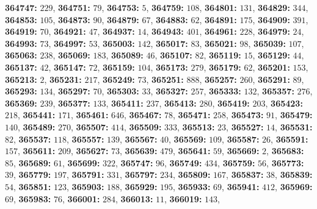 \textsf{\bfseries 364747:} $229$, \textsf{\bfseries 364751:} $79$, \textsf{\bfseries 364753:} $5$, \textsf{\bfseries 364759:} $108$, \textsf{\bfseries 364801:} $131$, \textsf{\bfseries 364829:} $344$, \textsf{\bfseries 364853:} $105$, \textsf{\bfseries 364873:} $90$, \textsf{\bfseries 364879:} $67$, \textsf{\bfseries 364883:} $62$, \textsf{\bfseries 364891:} $175$, \textsf{\bfseries 364909:} $391$, \textsf{\bfseries 364919:} $70$, \textsf{\bfseries 364921:} $47$, \textsf{\bfseries 364937:} $14$, \textsf{\bfseries 364943:} $401$, \textsf{\bfseries 364961:} $228$, \textsf{\bfseries 364979:} $24$, \textsf{\bfseries 364993:} $73$, \textsf{\bfseries 364997:} $53$, \textsf{\bfseries 365003:} $142$, \textsf{\bfseries 365017:} $83$, \textsf{\bfseries 365021:} $98$, \textsf{\bfseries 365039:} $107$, \textsf{\bfseries 365063:} $238$, \textsf{\bfseries 365069:} $183$, \textsf{\bfseries 365089:} $46$, \textsf{\bfseries 365107:} $82$, \textsf{\bfseries 365119:} $15$, \textsf{\bfseries 365129:} $44$, \textsf{\bfseries 365137:} $42$, \textsf{\bfseries 365147:} $72$, \textsf{\bfseries 365159:} $104$, \textsf{\bfseries 365173:} $279$, \textsf{\bfseries 365179:} $62$, \textsf{\bfseries 365201:} $153$, \textsf{\bfseries 365213:} $2$, \textsf{\bfseries 365231:} $217$, \textsf{\bfseries 365249:} $73$, \textsf{\bfseries 365251:} $888$, \textsf{\bfseries 365257:} $260$, \textsf{\bfseries 365291:} $89$, \textsf{\bfseries 365293:} $134$, \textsf{\bfseries 365297:} $70$, \textsf{\bfseries 365303:} $33$, \textsf{\bfseries 365327:} $257$, \textsf{\bfseries 365333:} $132$, \textsf{\bfseries 365357:} $276$, \textsf{\bfseries 365369:} $239$, \textsf{\bfseries 365377:} $133$, \textsf{\bfseries 365411:} $237$, \textsf{\bfseries 365413:} $280$, \textsf{\bfseries 365419:} $203$, \textsf{\bfseries 365423:} $218$, \textsf{\bfseries 365441:} $171$, \textsf{\bfseries 365461:} $646$, \textsf{\bfseries 365467:} $78$, \textsf{\bfseries 365471:} $258$, \textsf{\bfseries 365473:} $91$, \textsf{\bfseries 365479:} $140$, \textsf{\bfseries 365489:} $270$, \textsf{\bfseries 365507:} $414$, \textsf{\bfseries 365509:} $333$, \textsf{\bfseries 365513:} $23$, \textsf{\bfseries 365527:} $14$, \textsf{\bfseries 365531:} $82$, \textsf{\bfseries 365537:} $118$, \textsf{\bfseries 365557:} $139$, \textsf{\bfseries 365567:} $40$, \textsf{\bfseries 365569:} $109$, \textsf{\bfseries 365587:} $26$, \textsf{\bfseries 365591:} $157$, \textsf{\bfseries 365611:} $209$, \textsf{\bfseries 365627:} $73$, \textsf{\bfseries 365639:} $479$, \textsf{\bfseries 365641:} $59$, \textsf{\bfseries 365669:} $2$, \textsf{\bfseries 365683:} $85$, \textsf{\bfseries 365689:} $61$, \textsf{\bfseries 365699:} $322$, \textsf{\bfseries 365747:} $96$, \textsf{\bfseries 365749:} $434$, \textsf{\bfseries 365759:} $56$, \textsf{\bfseries 365773:} $39$, \textsf{\bfseries 365779:} $197$, \textsf{\bfseries 365791:} $331$, \textsf{\bfseries 365797:} $234$, \textsf{\bfseries 365809:} $167$, \textsf{\bfseries 365837:} $38$, \textsf{\bfseries 365839:} $54$, \textsf{\bfseries 365851:} $123$, \textsf{\bfseries 365903:} $188$, \textsf{\bfseries 365929:} $195$, \textsf{\bfseries 365933:} $69$, \textsf{\bfseries 365941:} $412$, \textsf{\bfseries 365969:} $69$, \textsf{\bfseries 365983:} $76$, \textsf{\bfseries 366001:} $284$, \textsf{\bfseries 366013:} $11$, \textsf{\bfseries 366019:} $143$, 
